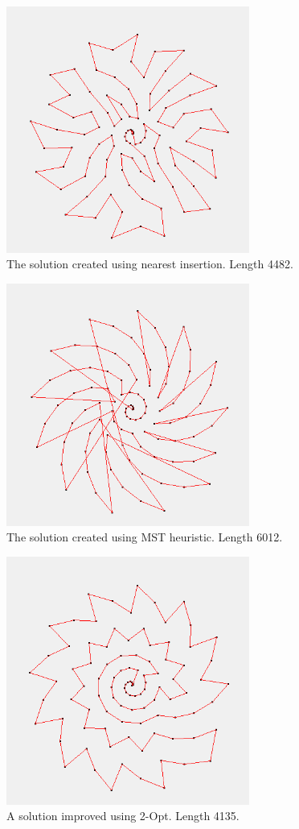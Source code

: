 \documentclass{report}
\begin{document}
\begin{figure}[h!]
\centering
\includegraphics[width=80mm]{ni_spiral}
\caption{The solution created using nearest insertion. Length 4482.}
\end{figure}

\begin{figure}[h!]
\centering
\includegraphics[width=80mm]{mst_spiral}
\caption{The solution created using MST heuristic. Length 6012.}
\end{figure}

\begin{figure}[h!]
\centering
\includegraphics[width=80mm]{opt2_spiral}
\caption{A solution improved using 2-Opt. Length 4135.}
\end{figure}
\end{document}
